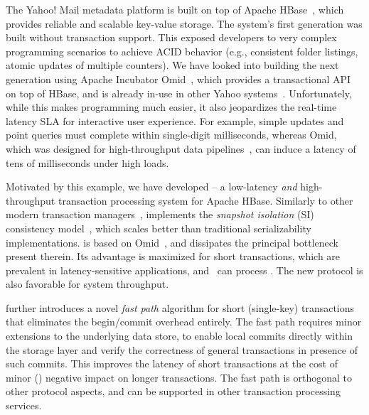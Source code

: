 The Yahoo! Mail metadata platform is built on top of Apache HBase~\cite{hbase}, 
which provides reliable and scalable key-value storage. The system's first generation
was built without transaction support. This exposed  developers to very complex programming scenarios 
to achieve ACID behavior (e.g., consistent folder listings, atomic updates of multiple counters). 
We have looked into building the next generation using 
 Apache Incubator Omid~\cite{omid}, which provides a transactional API on top of HBase, and 
 is already in-use in other Yahoo systems~\cite{Omid2017}.
Unfortunately, while this makes programming much easier, it also jeopardizes 
the real-time latency SLA for interactive user experience. For example,  
simple updates and point queries must complete within single-digit milliseconds, 
whereas Omid, which was designed for high-throughput data pipelines~\cite{Omid2017}, 
can induce a latency of tens of milliseconds under high loads. 

Motivated by this example, we have developed {\sys\/} -- a low-latency {\em and\/} high-throughput 
transaction processing system for Apache HBase. Similarly to other modern transaction 
managers~\cite{Percolator2010,Spanner2012,Omid2017,cockroach},
{\sys\/} implements the {\em snapshot isolation} (SI) consistency model~\cite{DBLP:conf/sigmod/BerensonBGMOO95},
which scales better than traditional serializability implementations. {\sys\/} is based on Omid~\cite{omid}, 
and dissipates the principal bottleneck present therein.
Its advantage is maximized for short  transactions, which are prevalent in latency-sensitive applications,
and \sys\ can process . The new protocol is also favorable for system throughput. 

{\sys\/} further introduces a novel {\em fast path\/} algorithm for short (single-key) transactions 
that eliminates the begin/commit overhead entirely. The fast path requires minor extensions to the underlying 
data store, to enable local commits directly within the storage layer and verify the correctness of general 
transactions in presence of such commits. This improves the latency of short transactions 
 at the cost of minor () negative impact on longer transactions. 
The fast path is orthogonal to other protocol aspects, and can be  supported in other 
transaction processing services.

